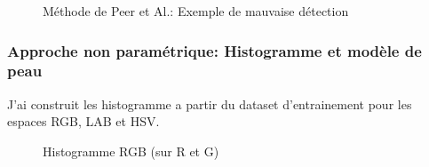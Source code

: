 \documentclass{article}
\begin{document}
\begin{figure}[h!]
  \centering
  \hfill
  \caption{Méthode de Peer et Al.: Exemple de mauvaise détection}
\end{figure}


\newpage
\subsubsection{Approche non paramétrique: Histogramme et modèle de peau}

J'ai construit les histogramme a partir du dataset d'entrainement pour les espaces RGB, LAB et HSV.
\begin{figure}[h!]
  \centering
  \hfill
  \caption{Histogramme RGB (sur R et G)}
\end{figure}
\end{document}
